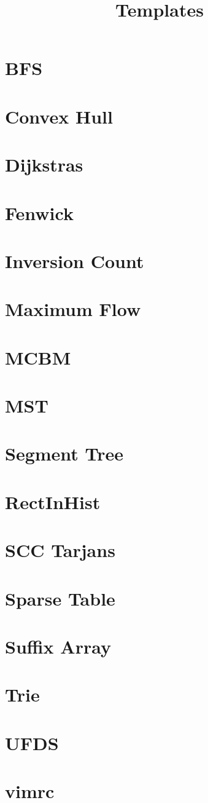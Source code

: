 \documentclass[]{article}
\begin{document}
    \title{Templates}
    {\tiny
    \section{BFS}
    
    \section{Convex Hull}
    
    \section{Dijkstras}
    
    \section{Fenwick}
    
    \section{Inversion Count}
    
    \section{Maximum Flow}
    
    \section{MCBM}
    
    \section{MST}
    
    \section{Segment Tree}
    
    \section{RectInHist}
    
    \section{SCC Tarjans}
    
    \section{Sparse Table}
    
    \section{Suffix Array}
    
    \section{Trie}
    
    \section{UFDS}
    
    \section{vimrc}
    
  }
\end{document}
